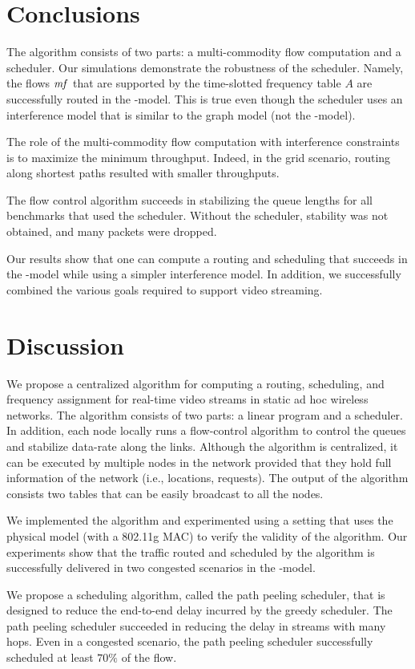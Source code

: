 \documentclass[12pt,oneside,english,a4paper]{book}
\theoremstyle{plain}
\theoremstyle{definition}
\theoremstyle{Theorem}
\theoremstyle{plain}
\newenvironment{proof sketch}[1]{\noindent {\emph{Proof sketch of #1:}}}{\hfill \qed}
\newcommand{\SINR}{\text{\sc{sinr}}}
\newcommand{\mf}{\text{\emph{mf}}}
\begin{document}
\chapter{Conclusions}
The algorithm consists of two parts: a multi-commodity flow
computation and a scheduler.  Our simulations demonstrate the
robustness of the scheduler.  Namely, the flows $\mf$ that are
supported by the time-slotted frequency table $A$ are successfully
routed in the \SINR-model. This is true even though the scheduler uses
an interference model that is similar to the graph model (not the \SINR-model).

The role of the multi-commodity flow computation with interference
constraints is to maximize the minimum throughput. Indeed, in the grid scenario, routing
along shortest paths resulted with smaller throughputs.

The flow control algorithm succeeds in stabilizing the queue lengths
for all benchmarks that used the scheduler. Without the scheduler,
stability was not obtained, and many packets were dropped.

Our results show that one can compute a routing and scheduling that
succeeds in the \SINR-model while using a simpler interference model.
In addition, we successfully combined the various goals required to
support video streaming.

\chapter{Discussion}
We propose a centralized algorithm for computing a routing,
scheduling, and frequency assignment for real-time video streams in
static ad hoc wireless networks.  The algorithm consists of two parts:
a linear program and a scheduler.  In addition, each node locally runs
a flow-control algorithm to control the queues and stabilize data-rate
along the links.  Although the algorithm is centralized, it can be
executed by multiple nodes in the network provided that they hold full
information of the network (i.e., locations, requests).  The output of
the algorithm consists two tables that can be easily broadcast to all the
nodes.

We implemented the algorithm and experimented using a setting that
uses the physical model (with a 802.11g MAC) to verify the validity of the algorithm.  Our
experiments show that the traffic routed and scheduled by the
algorithm is successfully delivered in two congested scenarios in the
\SINR-model.

We propose a scheduling algorithm, called the path peeling scheduler,
that is designed to reduce the end-to-end delay incurred by the greedy
scheduler. The path peeling scheduler succeeded in reducing the delay
in streams with many hops. Even in a congested scenario, the path
peeling scheduler successfully scheduled at least $70\%$ of the flow.
\end{document}
